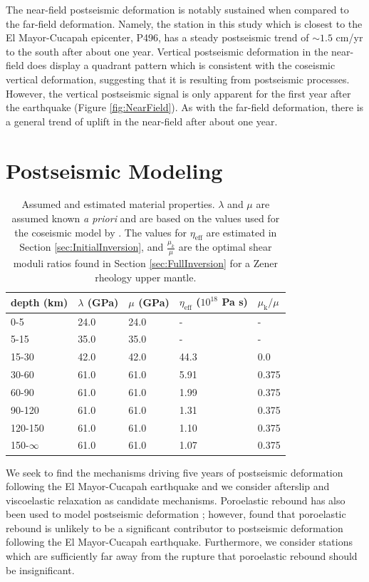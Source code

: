 \documentclass[draft,linenumbers]{AGUJournal}
\begin{document}
The near-field postseismic deformation is notably sustained when compared to the far-field deformation.  Namely, the station in this study which is closest to the El Mayor-Cucapah epicenter, P496, has a steady postseismic trend of ${\sim}1.5$ cm/yr to the south after about one year.  Vertical postseismic deformation in the near-field does display a quadrant pattern which is consistent with the coseismic vertical deformation, suggesting that it is resulting from postseismic processes.  However, the vertical postseismic signal is only apparent for the first year after the earthquake (Figure \ref{fig:NearField}).  As with the far-field deformation, there is a general trend of uplift in the near-field after about one year. 

\section{Postseismic Modeling}\label{sec:Model}

\begin{table}\label{tab:MaterialProperties}
\begin{tabular} {l l l l l}
depth (km) &$\lambda$ (GPa)&$\mu$ (GPa)&$\eta_\mathrm{eff}$ ($10^{18}$ Pa s) & $\mu_\mathrm{k}/\mu$\\ \hline
0-5 & 24.0 & 24.0 & - & -\\
5-15 & 35.0 & 35.0 & - & -\\
15-30 & 42.0 & 42.0 & 44.3 & 0.0\\
30-60 & 61.0 & 61.0 & 5.91 & 0.375\\
60-90 & 61.0 & 61.0 & 1.99 & 0.375\\
90-120 & 61.0 & 61.0 & 1.31 & 0.375\\
120-150 & 61.0 & 61.0 & 1.10 & 0.375\\
150-$\infty$ & 61.0 & 61.0 & 1.07 & 0.375\\
\end{tabular}
\caption{Assumed and estimated material properties. $\lambda$ and $\mu$ are assumed known \textit{a priori} and are based on the values used for the coseismic model by \citet{Wei2011}.  The values for $\eta_\mathrm{eff}$ are estimated in Section \ref{sec:InitialInversion}, and $\frac{\mu_k}{\mu}$ are the optimal shear moduli ratios found in Section \ref{sec:FullInversion} for a Zener rheology upper mantle.} 
\end{table}

We seek to find the mechanisms driving five years of postseismic deformation following the El Mayor-Cucapah earthquake and we consider afterslip and viscoelastic relaxation as candidate mechanisms.  Poroelastic rebound has also been used to model postseismic deformation \citep[e.g.][]{Jonsson2003}; however, \citet{Gonzalez-ortega2014} found that poroelastic rebound is unlikely to be a significant contributor to postseismic deformation following the El Mayor-Cucapah earthquake. Furthermore, we consider stations which are sufficiently far away from the rupture that poroelastic rebound should be insignificant.  
\end{document}
